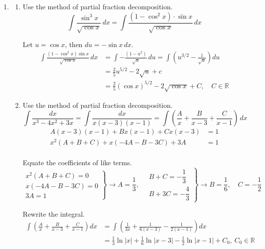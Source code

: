 \documentclass[a4paper, 12pt]{article}
\begin{document}

\begin{enumerate}[leftmargin=*,label=\textbf{\arabic*.}]
\item \begin{enumerate}[leftmargin=*,label=\textbf{\alph*.}]
\item Use the method of partial fraction decomposition.
\[\int\frac{\sin^3x}{\sqrt{\cos x}}\,dx=\int\frac{\left(1-\cos^2x\right)\cdot\sin x}{\sqrt{\cos x}}\,dx\]

Let $u=\cos x$, then $du=-\sin x\,dx$.
\begin{align*}
\int\frac{\left(1-\cos^2x\right)\sin x}{\sqrt{\cos x}}\,dx
&=\int-\frac{\left(1-u^2\right)}{\sqrt{u}}\,du
=\int\left(u^{3/2}-\frac1{\sqrt u}\right)du
\\[1em]
&=\frac25u^{5/2}-2\sqrt u+c\\[1em]
&=\boxed{\frac25\left(\cos x\right)^{5/2}-2\sqrt{\cos x}+C,\quad C\in\mathbb{R}}
\end{align*}

\item Use the method of partial fraction decomposition.
\[\int\frac{dx}{x^3-4x^2+3x}=\int\frac{dx}{x(x-3)(x-1)}=\int\left(\frac Ax+\frac B{x-3}+\frac C{x-1}\right)\,dx\]
\[\begin{array}{rc}
A(x-3)(x-1)+Bx(x-1)+Cx(x-3)&=1\\
x^2(A+B+C)+x(-4A-B-3C)+3A&=1\\
&
\end{array}\]

Equate the coefficients of like terms.
\[\left.\begin{array}{r}
x^2(A+B+C)=0\\
x(-4A-B-3C)=0\\
3A=1
\end{array}\right\}\rightarrow A=\frac13,\quad
\left.\begin{array}{r}
B+C=-\dfrac13\\[1em]
B+3C=-\dfrac43
\end{array}\right\}\rightarrow B=\frac16,\quad C=-\frac12\]

Rewrite the integral.
\begin{align*}
\int\left(\frac Ax+\frac B{x-3}+\frac C{x-1}\right)dx
&=\int\left(\frac1{3x}+\frac1{6(x-3)}-\frac1{2(x-1)}\right)dx\\[1em]
&=\boxed{\frac13\ln|x|+\frac16\ln|x-3|-\frac12\ln|x-1|+C_0,\:C_0\in\mathbb{R}}
\end{align*}


\end{enumerate}
\end{enumerate}
\end{document}
